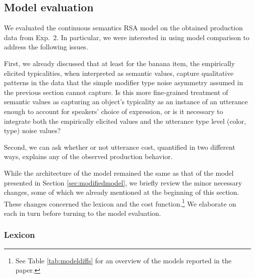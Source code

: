 \documentclass[11pt]{article}
\newcommand{\tableref}[1]{Table \ref{#1}}
\newcommand{\sectionref}[1]{Section \ref{#1}}
\begin{document}
\subsection{Model evaluation}
\label{sec:colorypicalitymodel}


We evaluated the continuous semantics RSA model on the obtained production data from Exp.~2. In particular, we were interested in using model comparison to address the following issues. 

First, we already discussed that at least for the banana item, the empirically elicited typicalities, when interpreted as semantic values, capture qualitative  patterns in the data that the simple modifier type noise asymmetry assumed in the previous section cannot capture. Is this more fine-grained treatment of semantic values as capturing an object's typicality as an instance of an utterance enough to account for speakers' choice of expression, or is it necessary to integrate both the empirically elicited values and the utterance type level (color, type) noise values?

Second, we can ask whether or not utterance cost, quantified in two different ways, explains any of the observed production behavior. 

While the architecture of the model remained the same as that of the model presented in \sectionref{sec:modifiedmodel}, we briefly review the minor necessary changes, some of which we already mentioned at the beginning of this section. These changes concerned the lexicon and the cost function.\footnote{See \tableref{tab:modeldiffs} for an overview of the models reported in the paper.} We elaborate on each in turn before turning to the model evaluation. 

\subsubsection{Lexicon}
\end{document}
